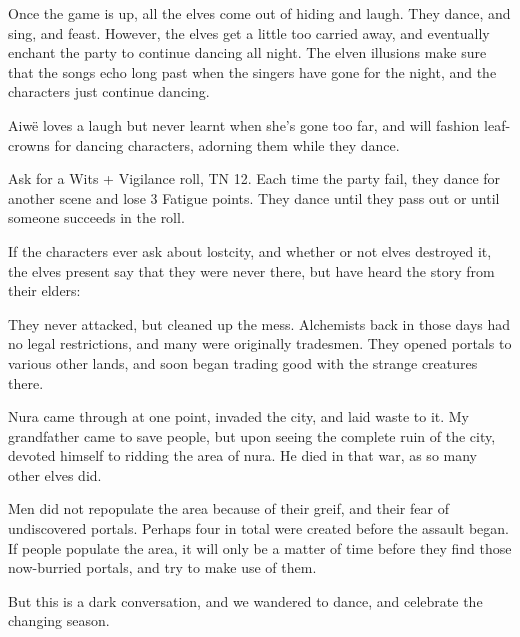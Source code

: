 \begin{multicols}{2}
Once the game is up, all the elves come out of hiding and laugh.  They dance, and sing, and feast.  However, the elves get a little too carried away, and eventually enchant the party to continue dancing all night.  The elven illusions make sure that the songs echo long past when the singers have gone for the night, and the characters just continue dancing.
 

\elf

Aiw\"{e} loves a laugh but never learnt when she's gone too far, and will fashion leaf-crowns for dancing characters, adorning them while they dance.


\elf


\elvenenchanter

Ask for a Wits + Vigilance roll, TN 12.  Each time the party fail, they dance for another scene and lose 3 Fatigue points.  They dance until they pass out or until someone succeeds in the roll.

If the characters ever ask about \gls{lostcity}, and whether or not elves destroyed it, the elves present say that they were never there, but have heard the story from their elders:

\begin{speechtext}

	They never attacked, but cleaned up the mess.  Alchemists back in those days had no legal restrictions, and many were originally tradesmen.  They opened portals to various other lands, and soon began trading good with the strange creatures there.

	Nura came through at one point, invaded the city, and laid waste to it.  My grandfather came to save people, but upon seeing the complete ruin of the city, devoted himself to ridding the area of nura.  He died in that war, as so many other elves did.

	Men did not repopulate the area because of their greif, and their fear of undiscovered portals.  Perhaps four in total were created before the assault began.  If people populate the area, it will only be a matter of time before they find those now-burried portals, and try to make use of them.

	But this is a dark conversation, and we wandered to dance, and celebrate the changing season.


\end{speechtext}
\end{multicols}
